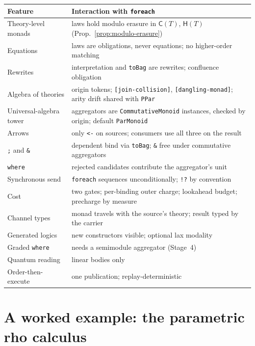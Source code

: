 \documentclass[11pt]{article}
\theoremstyle{definition}
\theoremstyle{plain}
\theoremstyle{remark}
\newcommand{\rhoc}{\textsf{rho}}
\newcommand{\cost}{\mathsf{C}}
\newcommand{\hist}{\mathsf{H}}
\newcommand{\fe}{\texttt{foreach}}
\begin{document}
\begin{center}
\small
\begin{tabular}{@{}L{0.22\textwidth}L{0.70\textwidth}@{}}
\toprule
\textbf{Feature} & \textbf{Interaction with \fe{}} \\
\midrule
Theory-level monads & laws hold modulo erasure in \(\cost(T)\), \(\hist(T)\)
(Prop.~\ref{prop:modulo-erasure}) \\[2pt]
Equations & laws are obligations, never equations; no higher-order matching \\[2pt]
Rewrites & interpretation and \texttt{toBag} are rewrites; confluence
obligation \\[2pt]
Algebra of theories & origin tokens; \texttt{[join-collision]},
\texttt{[dangling-monad]}; arity drift shared with \texttt{PPar} \\[2pt]
Universal-algebra tower & aggregators are \texttt{CommutativeMonoid}
instances, checked by origin; default \texttt{ParMonoid} \\[2pt]
Arrows & only \texttt{<-} on sources; consumers use all three on the
result \\[2pt]
\texttt{;} and \texttt{\&} & dependent bind via \texttt{toBag}; \texttt{\&}
free under commutative aggregators \\[2pt]
\texttt{where} & rejected candidates contribute the aggregator's unit \\[2pt]
Synchronous send & \fe{} sequences unconditionally; \verb|!?| by
convention \\[2pt]
Cost & two gates; per-binding outer charge; lookahead budget; precharge by
measure \\[2pt]
Channel types & monad travels with the source's theory; result typed by the
carrier \\[2pt]
Generated logics & new constructors visible; optional lax modality \\[2pt]
Graded \texttt{where} & needs a semimodule aggregator (Stage~4) \\[2pt]
Quantum reading & linear bodies only \\[2pt]
Order-then-execute & one publication; replay-deterministic \\
\bottomrule
\end{tabular}
\end{center}

\section{A worked example: the parametric \texorpdfstring{\rhoc{}}{rho} calculus}
\label{sec:rho}
\end{document}

